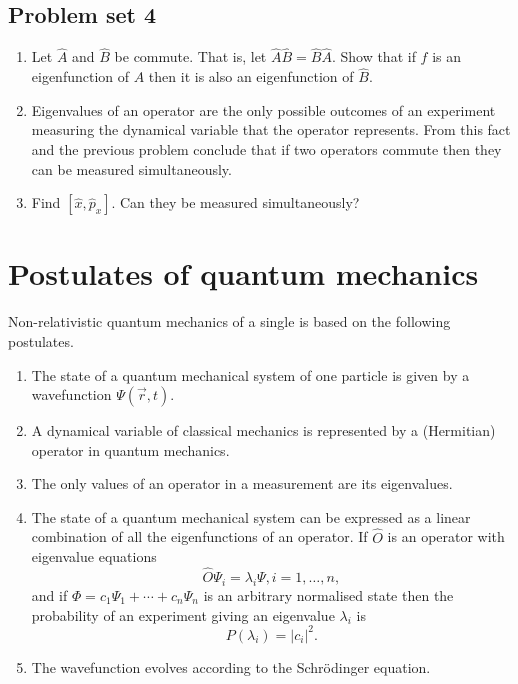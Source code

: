 \subsection{Problem set 4}
\begin{enumerate}
\item Let $\hat{A}$ and $\hat{B}$ be commute. That is, let $\hat{A}\hat{B} =
\hat{B}\hat{A}$. Show that if $f$ is an eigenfunction of $A$ then it is also an
eigenfunction of $\hat{B}$.
\item Eigenvalues of an operator are the only possible outcomes of an experiment
measuring the dynamical variable that the operator represents. From this fact 
and the previous problem conclude that if two operators commute then they can
be measured simultaneously.
\item Find $[\hat{x}, \hat{p}_x]$. Can they be measured simultaneously?
\end{enumerate}

\section{Postulates of quantum mechanics}\label{c4s4}
Non-relativistic quantum mechanics of a single is based on the following 
postulates.
\begin{enumerate}
\item The state of a quantum mechanical system of one particle is given by a
wavefunction $\Psi(\vec{r}, t)$.
\item A dynamical variable of classical mechanics is represented by a 
(Hermitian) operator in quantum mechanics.
\item The only values of an operator in a measurement are its eigenvalues.
\item The state of a quantum mechanical system can be expressed as a linear
combination of all the eigenfunctions of an operator. If $\hat{O}$ is an 
operator with eigenvalue equations
\begin{equation}\label{c4s4e1}
\hat{O}\Psi_i = \lambda_i\Psi, i = 1, \ldots, n,
\end{equation}
and if $\Phi = c_1\Psi_1 + \cdots + c_n\Psi_n$ is an arbitrary normalised state
then the probability of an experiment giving an eigenvalue $\lambda_i$ is
\begin{equation}\label{c4s4e2}
P(\lambda_i) = |c_i|^2.
\end{equation}
\item The wavefunction evolves according to the Schr\"{o}dinger equation.
\end{enumerate}

